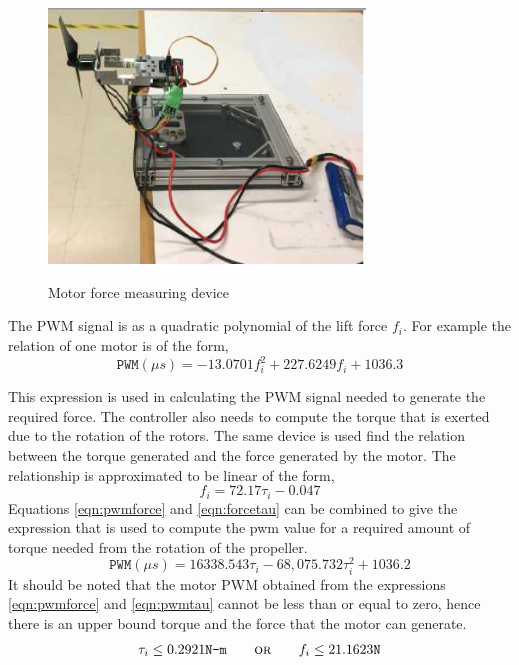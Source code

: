 \documentclass[letterpaper%
, twoside%
, 12pt%
,memoire%
, english%
,creativecommons,hyperref%
]{thETS}
\begin{document}
\begin{figure}
	\centering
	\includegraphics[width=0.75\textwidth,height=0.50\textwidth]{Figures/quad/rcd_c2.png}
	 \\ \parbox{0.75\textwidth}{\caption{Motor force measuring device \citep{RN121}}\label{rcd_c2}} 
\end{figure}
The PWM signal is as a quadratic polynomial of the lift force $f_i$. For example the relation of one motor is of the form, 
\begin{equation} \label{eqn:pwmforce}
\texttt{PWM} (\mu s)= -13.0701f_i^2+227.6249f_i +1036.3
\end{equation}

This expression is used in calculating the PWM signal needed to generate the required force. The controller also needs to compute the torque that is exerted due to the rotation of the rotors. The same device is used find the relation between the torque generated and the force generated by the motor. The relationship is approximated to be linear of the form, 
\begin{equation} \label{eqn:forcetau}
f_i=72.17\tau_i-0.047
\end{equation}
Equations \eqref{eqn:pwmforce} and \eqref{eqn:forcetau} can be combined to give the expression that is used to compute the pwm value for a required amount of torque needed from the rotation of the propeller. 
\begin{equation} \label{eqn:pwmtau}
\texttt{PWM} (\mu s)= 16338.543\tau_i -68,075.732\tau_i^2 +1036.2
\end{equation}
It should be noted that the motor PWM obtained from the expressions \eqref{eqn:pwmforce} and \eqref{eqn:pwmtau} cannot be less than or equal to zero, hence there is an upper bound torque and the force that the motor can generate. 
\begin{align*}
\tau_i \leq 0.2921\texttt{N-m} \qquad \textsc{or}\qquad f_i \leq  21.1623\texttt{N}
\end{align*}
\end{document}
